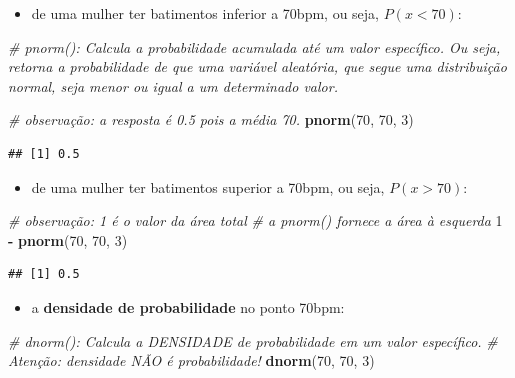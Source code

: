 \documentclass[
]{book}
\newenvironment{Shaded}{\begin{snugshade}}{\end{snugshade}}
\newcommand{\CommentTok}[1]{\textcolor[rgb]{0.56,0.35,0.01}{\textit{#1}}}
\newcommand{\DecValTok}[1]{\textcolor[rgb]{0.00,0.00,0.81}{#1}}
\newcommand{\FunctionTok}[1]{\textcolor[rgb]{0.13,0.29,0.53}{\textbf{#1}}}
\newcommand{\NormalTok}[1]{#1}
\newcommand{\SpecialCharTok}[1]{\textcolor[rgb]{0.81,0.36,0.00}{\textbf{#1}}}
\providecommand{\tightlist}{%
  \setlength{\itemsep}{0pt}\setlength{\parskip}{0pt}}
\begin{document}
\begin{itemize}
\tightlist
\item
  de uma mulher ter batimentos inferior a 70bpm, ou seja, \(P(x<70)\):
\end{itemize}

\begin{Shaded}
\begin{Highlighting}[]
\CommentTok{\# pnorm(): Calcula a probabilidade acumulada até um valor específico. Ou seja, retorna a probabilidade de que uma variável aleatória, que segue uma distribuição normal, seja menor ou igual a um determinado valor.}

\CommentTok{\# observação: a resposta é 0.5 pois a média 70.}
\FunctionTok{pnorm}\NormalTok{(}\DecValTok{70}\NormalTok{, }\DecValTok{70}\NormalTok{, }\DecValTok{3}\NormalTok{)}
\end{Highlighting}
\end{Shaded}

\begin{verbatim}
## [1] 0.5
\end{verbatim}

\begin{itemize}
\tightlist
\item
  de uma mulher ter batimentos superior a 70bpm, ou seja, \(P(x>70)\):
\end{itemize}

\begin{Shaded}
\begin{Highlighting}[]
\CommentTok{\# observação: 1 é o valor da área total}
\CommentTok{\# a pnorm() fornece a área à esquerda}
\DecValTok{1} \SpecialCharTok{{-}} \FunctionTok{pnorm}\NormalTok{(}\DecValTok{70}\NormalTok{, }\DecValTok{70}\NormalTok{, }\DecValTok{3}\NormalTok{)}
\end{Highlighting}
\end{Shaded}

\begin{verbatim}
## [1] 0.5
\end{verbatim}

\begin{itemize}
\tightlist
\item
  a \textbf{densidade de probabilidade} no ponto 70bpm:
\end{itemize}

\begin{Shaded}
\begin{Highlighting}[]
\CommentTok{\# dnorm(): Calcula a DENSIDADE de probabilidade em um valor específico.}
\CommentTok{\# Atenção: densidade NÃO é probabilidade!}
\FunctionTok{dnorm}\NormalTok{(}\DecValTok{70}\NormalTok{, }\DecValTok{70}\NormalTok{, }\DecValTok{3}\NormalTok{)}
\end{Highlighting}
\end{Shaded}
\end{document}
